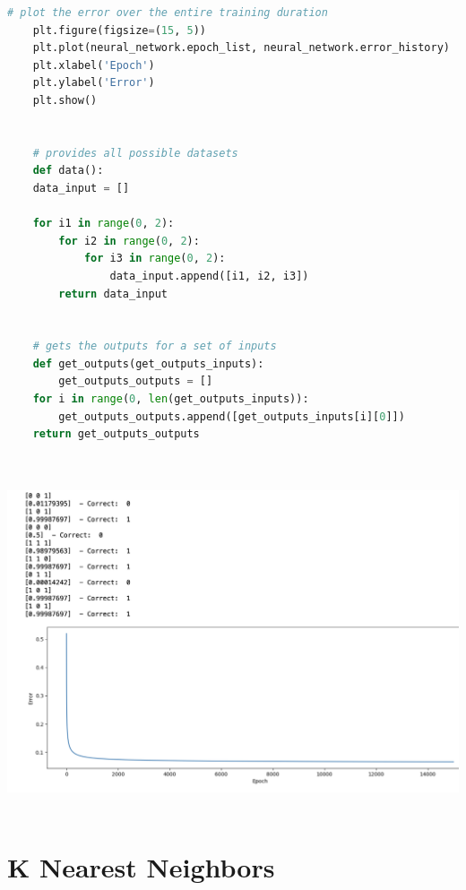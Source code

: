 \documentclass{article}
\begin{document}
\begin{lstlisting}[language= Python]
	# plot the error over the entire training duration
	plt.figure(figsize=(15, 5))
	plt.plot(neural_network.epoch_list, neural_network.error_history)
	plt.xlabel('Epoch')
	plt.ylabel('Error')
	plt.show()
	
	
	# provides all possible datasets
	def data():
	data_input = []
	
	for i1 in range(0, 2):
		for i2 in range(0, 2):
			for i3 in range(0, 2):
				data_input.append([i1, i2, i3])
		return data_input
	
	
	# gets the outputs for a set of inputs
	def get_outputs(get_outputs_inputs):
		get_outputs_outputs = []
	for i in range(0, len(get_outputs_inputs)):
		get_outputs_outputs.append([get_outputs_inputs[i][0]])
	return get_outputs_outputs
	
	
	\end{lstlisting}
	
	\includegraphics[scale=0.5]{images/4.png}\\\\

	
	
	\section{K Nearest Neighbors}
	
\end{document}
